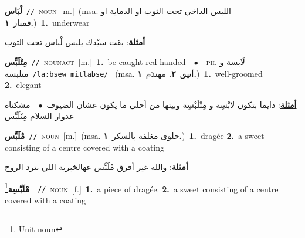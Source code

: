 \documentclass[10pt,a4paper,twoside]{article} %
\begin{document}
\begin{multicols}{2}
{{{{{{{{{\setlength\topsep{0pt}\textbf{\foreignlanguage{arabic}{لْبَاس}}\ {\color{gray}\texttt{//}\color{black}}\ \textsc{noun}\ [m.]\ \color{gray}(msa. \foreignlanguage{arabic}{اللبس الداخي تحت الثوب او الدماية او قمباز}~\foreignlanguage{arabic}{\textbf{١.}})\color{black}\ \textbf{1.}~underwear\  \begin{flushright}\color{gray}\foreignlanguage{arabic}{\textbf{\underline{\foreignlanguage{arabic}{أمثلة}}}: بقت سيْدك يلبس لْباس تحت الثوب}\end{flushright}\color{black}} \vspace{2mm}

{\setlength\topsep{0pt}\textbf{\foreignlanguage{arabic}{مِتْلَبِّس}}\ {\color{gray}\texttt{//}\color{black}}\ \textsc{noun\textunderscore act}\ [m.]\ \textbf{1.}~be caught red-handed\ \ $\bullet$\ \ \textsc{ph.} \color{gray} \foreignlanguage{arabic}{لَابسة و متلبسة}\color{black}\ {\color{gray}\texttt{/{\sffamily laːbsew mitlabse}/}\color{black}}\ \color{gray} (msa. \foreignlanguage{arabic}{أنيق}~\foreignlanguage{arabic}{\textbf{٢.}}  \foreignlanguage{arabic}{مهندَم}~\foreignlanguage{arabic}{\textbf{١.}})\color{black}\ \textbf{1.}~well-groomed  \textbf{2.}~elegant\  \begin{flushright}\color{gray}\foreignlanguage{arabic}{\textbf{\underline{\foreignlanguage{arabic}{أمثلة}}}: دايما بتكون لابْسِة و مِتْلَبْسِة وبيتها من أحلى ما يكون عشان الضيوف\ $\bullet$\ \  مشكناه عدوار السلام مِتْلَبِّس}\end{flushright}\color{black}} \vspace{2mm}

{\setlength\topsep{0pt}\textbf{\foreignlanguage{arabic}{مْلَبَّس}}\ {\color{gray}\texttt{//}\color{black}}\ \textsc{noun}\ [m.]\ \color{gray}(msa. \foreignlanguage{arabic}{حلوى مغلفة بالسكر}~\foreignlanguage{arabic}{\textbf{١.}})\color{black}\ \textbf{1.}~dragée  \textbf{2.}~a sweet consisting of a centre covered with a coating\  \begin{flushright}\color{gray}\foreignlanguage{arabic}{\textbf{\underline{\foreignlanguage{arabic}{أمثلة}}}: والله غير أفرق مْلَبَّس عهالخبرية اللي بترد الروح}\end{flushright}\color{black}} \vspace{2mm}

{\setlength\topsep{0pt}\textbf{\foreignlanguage{arabic}{مْلَبَّسِة}}\footnote{Unit noun}\ \ {\color{gray}\texttt{//}\color{black}}\ \textsc{noun}\ [f.]\ \textbf{1.}~a piece of dragée.  \textbf{2.}~a sweet consisting of a centre covered with a coating\ 

}}}}}}}}}
\end{multicols}
\end{document}

